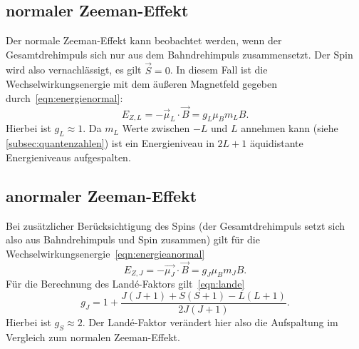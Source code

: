 \subsection*{normaler Zeeman-Effekt}
Der normale Zeeman-Effekt kann beobachtet werden, wenn der Gesamtdrehimpuls
sich nur aus dem Bahndrehimpuls zusammensetzt. Der Spin wird also
vernachlässigt, es gilt $\vec{S} = 0$.
In diesem Fall ist die Wechselwirkungsenergie mit dem äußeren Magnetfeld
gegeben durch~\ref{eqn:energienormal}:
\begin{equation}
  E_{Z,L} = - \vec{\mu}_{L} \cdot \vec{B} = g_{L} \mu_{B} m_{L} B.
  \label{eqn:energienormal}
\end{equation}
Hierbei ist $g_{L} \approx 1$.
Da $m_{L}$ Werte zwischen $-L$ und $L$ annehmen kann (siehe \ref{subsec:quantenzahlen})
ist ein Energieniveau in $2L+1$ äquidistante Energieniveaus aufgespalten.
\subsection*{anormaler Zeeman-Effekt}
Bei zusätzlicher Berücksichtigung des Spins (der Gesamtdrehimpuls setzt sich also
aus Bahndrehimpuls und Spin zusammen) gilt für die
Wechselwirkungsenergie~\ref{eqn:energieanormal}
\begin{equation}
 E_{Z, J} = -\vec{\mu_{J}} \cdot \vec{B} = g_{J} \mu_{B}m_{J} B.
 \label{eqn:energieanormal}
\end{equation}
Für die Berechnung des Land\'e-Faktors gilt~\ref{eqn:lande}
\begin{equation}
  g_{J} = 1 + \frac{J(J+1) + S(S+1) - L(L+1)}{2J(J+1)}.
  \label{eqn:lande}
\end{equation}
Hierbei ist $g_{S} \approx 2$. Der Land\'e-Faktor verändert hier also die Aufspaltung
im Vergleich zum normalen Zeeman-Effekt.

